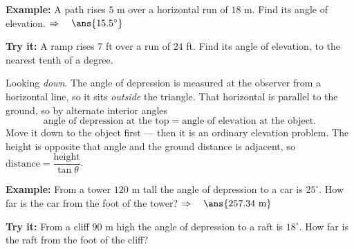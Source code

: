 \documentclass[12pt]{article}
\begin{document}
\begin{examplebox}
\textbf{Example:} A path rises $5$ m over a horizontal run of $18$ m. Find its
angle of elevation.
$\Rightarrow\quad \ans{15.5^\circ}$
\end{examplebox}

\begin{tryitbox}
\textbf{Try it:} A ramp rises $7$ ft over a run of $24$ ft. Find its angle of
elevation, to the nearest tenth of a degree.\\[2pt]
\end{tryitbox}


\begin{formulabox}
Looking \emph{down}. The angle of depression is measured at the observer from a
horizontal line, so it sits \emph{outside} the triangle. That horizontal is
parallel to the ground, so by alternate interior angles
\[
\text{angle of depression at the top} \;=\; \text{angle of elevation at the object.}
\]
Move it down to the object first --- then it is an ordinary elevation problem.
The height is opposite that angle and the ground distance is adjacent, so
$\text{distance} = \dfrac{\text{height}}{\tan\theta}$.
\end{formulabox}

\begin{examplebox}
\textbf{Example:} From a tower $120$ m tall the angle of depression to a car is
$25^\circ$. How far is the car from the foot of the tower?
$\Rightarrow\quad \ans{257.34\ \text{m}}$
\end{examplebox}

\begin{tryitbox}
\textbf{Try it:} From a cliff $90$ m high the angle of depression to a raft is
$18^\circ$. How far is the raft from the foot of the cliff?\\[2pt]
\end{tryitbox}
\end{document}

